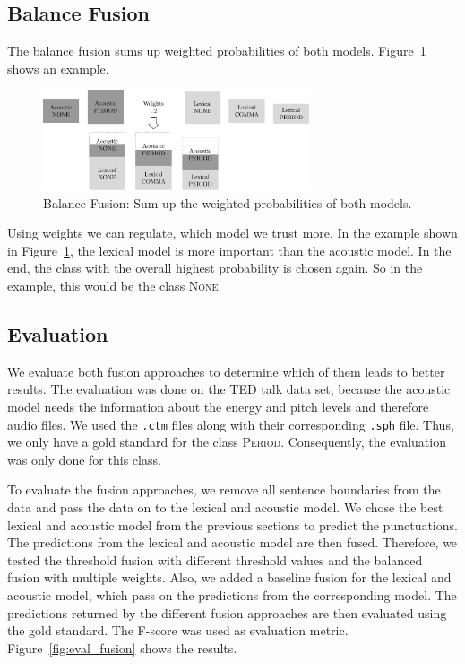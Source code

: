 \subsection{Balance Fusion}
The balance fusion sums up weighted probabilities of both models.
Figure~\ref{fig:fusion_2} shows an example.
\begin{figure}[ht]
    \centering
    \includegraphics[width=0.7\textwidth]{img/fusion_2.pdf}
    \caption{Balance Fusion: Sum up the weighted probabilities of both models.}
    \label{fig:fusion_2}
\end{figure}
Using weights we can regulate, which model we trust more.
In the example shown in Figure~\ref{fig:fusion_2}, the lexical model is more important than the acoustic model.
In the end, the class with the overall highest probability is chosen again.
So in the example, this would be the class \textsc{None}.

\subsection{Evaluation}
We evaluate both fusion approaches to determine which of them leads to better results.
The evaluation was done on the TED talk data set, because the acoustic model needs the information about the energy and pitch levels and therefore audio files.
We used the \texttt{.ctm} files along with their corresponding \texttt{.sph} file.
Thus, we only have a gold standard for the class \textsc{Period}.
Consequently, the evaluation was only done for this class.

To evaluate the fusion approaches, we remove all sentence boundaries from the data and pass the data on to the lexical and acoustic model.
We chose the best lexical and acoustic model from the previous sections to predict the punctuations.
The predictions from the lexical and acoustic model are then fused.
Therefore, we tested the threshold fusion with different threshold values and the balanced fusion with multiple weights.
Also, we added a baseline fusion for the lexical and acoustic model, which pass on the predictions from the corresponding model.
The predictions returned by the different fusion approaches are then evaluated using the gold standard.
The F-score was used as evaluation metric.
Figure~\ref{fig:eval_fusion} shows the results.

